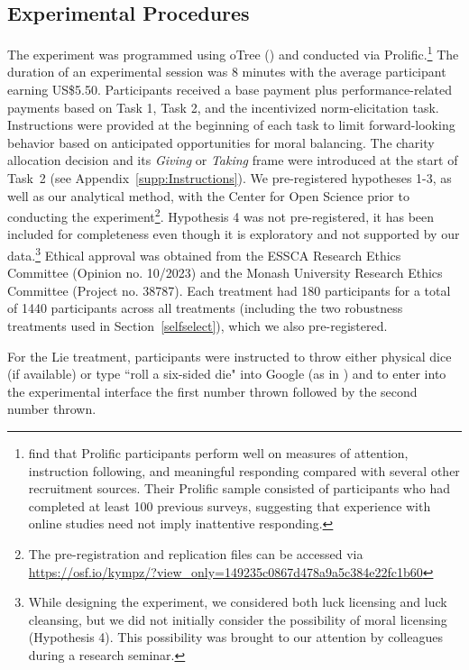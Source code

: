 \documentclass{article}
\begin{document}
\subsection{Experimental Procedures}
The experiment was programmed using oTree (\cite{Chen2016}) and conducted via Prolific.\footnote{\textcite{Douglas2023} find that Prolific participants perform well on measures of attention, instruction following, and meaningful responding compared with several other recruitment sources. Their Prolific sample consisted of participants who had completed at least 100 previous surveys, suggesting that experience with online studies need not imply inattentive responding.} The duration of an experimental session was 8 minutes with the average participant earning US\$5.50. Participants received a base payment plus performance-related payments based on Task 1, Task 2, and the incentivized norm-elicitation task. Instructions were provided at the beginning of each task to limit forward-looking behavior based on anticipated opportunities for moral balancing. The charity allocation decision and its \textit{Giving} or \textit{Taking} frame were introduced at the start of Task~2 (see Appendix~\ref{supp:Instructions}). We pre-registered hypotheses 1-3, as well as our analytical method, with the Center for Open Science prior to conducting the experiment\footnote{The pre-registration and replication files can be accessed via \url{https://osf.io/kympz/?view_only=149235c0867d478a9a5c384e22fc1b60}}. Hypothesis 4 was not pre-registered, it has been included for completeness even though it is exploratory and not supported by our data.\footnote{While designing the experiment, we considered both luck licensing and luck cleansing, but we did not initially consider the possibility of moral licensing (Hypothesis 4). This possibility was brought to our attention by colleagues during a research seminar.} Ethical approval was obtained from the ESSCA Research Ethics Committee (Opinion no. 10/2023) and the Monash University Research Ethics Committee (Project no. 38787). Each treatment had 180 participants for a total of 1440 participants across all treatments (including the two robustness treatments used in Section~\ref{selfselect}), which we also pre-registered.
\par 
For the Lie treatment, participants were instructed to throw either physical dice (if available) or type ``roll a six-sided die" into Google (as in \cite{Basic2022}) and to enter into the experimental interface the first number thrown followed by the second number thrown.
\end{document}
